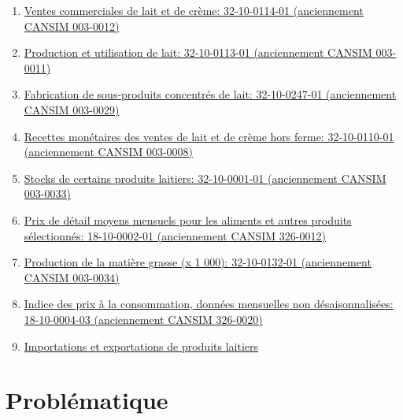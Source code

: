 \documentclass[11pt]{article}
\providecommand{\tightlist}{%
      \setlength{\itemsep}{0pt}\setlength{\parskip}{0pt}}
\begin{document}
    \begin{enumerate}
\def\labelenumi{\arabic{enumi}.}
\tightlist
\item
  \href{https://www150.statcan.gc.ca/t1/tbl1/fr/tv.action?pid=3210011401}{Ventes
  commerciales de lait et de crème: 32-10-0114-01 (anciennement CANSIM
  003-0012)}
\item
  \href{https://www150.statcan.gc.ca/t1/tbl1/fr/tv.action?pid=3210011301}{Production
  et utilisation de lait: 32-10-0113-01 (anciennement CANSIM 003-0011)}
\item
  \href{https://www150.statcan.gc.ca/t1/tbl1/fr/tv.action?pid=3210024701}{Fabrication
  de sous-produits concentrés de lait: 32-10-0247-01 (anciennement
  CANSIM 003-0029)}
\item
  \href{https://www150.statcan.gc.ca/t1/tbl1/fr/tv.action?pid=3210011001}{Recettes
  monétaires des ventes de lait et de crème hors ferme: 32-10-0110-01
  (anciennement CANSIM 003-0008)}
\item
  \href{https://www150.statcan.gc.ca/t1/tbl1/fr/tv.action?pid=3210000101}{Stocks
  de certains produits laitiers: 32-10-0001-01 (anciennement CANSIM
  003-0033)}
\item
  \href{https://www150.statcan.gc.ca/t1/tbl1/fr/tv.action?pid=1810000201}{Prix
  de détail moyens mensuels pour les aliments et autres produits
  sélectionnés: 18-10-0002-01 (anciennement CANSIM 326-0012)}
\item
  \href{https://www150.statcan.gc.ca/t1/tbl1/fr/tv.action?pid=3210013201}{Production
  de la matière grasse (x 1 000): 32-10-0132-01 (anciennement CANSIM
  003-0034)}
\item
  \href{https://www150.statcan.gc.ca/t1/tbl1/fr/tv.action?pid=1810000403}{Indice
  des prix à la consommation, données mensuelles non désaisonnalisées:
  18-10-0004-03 (anciennement CANSIM 326-0020)}
\item
  \href{http://www.dairyinfo.gc.ca/index_f.php?s1=dff-fcil\#trade}{Importations
  et exportations de produits laitiers}
\end{enumerate}

    \section{Problématique}\label{probluxe9matique}
\end{document}
